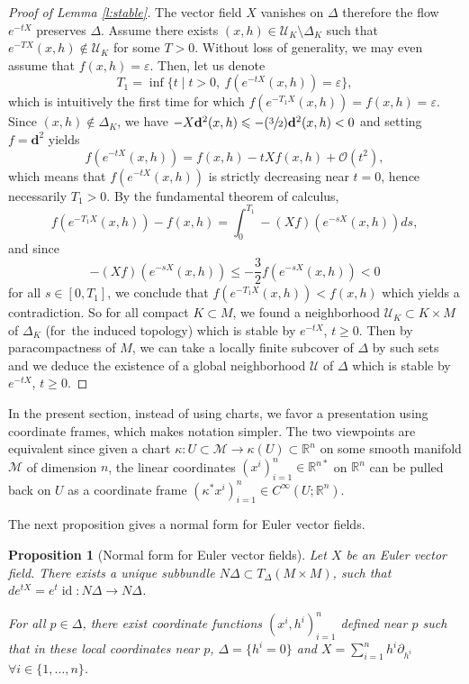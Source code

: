 \documentclass[10pt]{amsart}
\let\pazocal\mathscr
\newcommand{\Psfrac}[2]{(\sfrac{#1}{#2})}
\newtheorem{proposition}[theorem]{Proposition}
\theoremstyle{definition}
\newenvironment{refproof}[1]{\begin{proof}[Proof of {#1}]}{\end{proof}}
\let\st\mid
\let\euler X
\DeclareMathOperator\id{id}
\begin{document}
\begin{refproof}{Lemma \ref{l:stable}}
The vector field $\euler$ vanishes on $\Delta$ therefore the flow $e^{-t\euler}$
preserves $\Delta$.
Assume there exists $(x,h)\in \pazocal{U}_K\setminus \Delta_K$ such that $e^{-T\euler}(x,h)\notin \pazocal{U}_K$ for some $T> 0$.
Without loss of generality, we may even assume that $f(x,h)=\varepsilon$.
Then,
let us denote
\[
T_1=\inf\{t \st t>0,\ f(e^{-t\euler}(x,h))=\varepsilon \},
\]
which is intuitively
the first time for which $f(e^{-T_1\euler}(x,h))=f(x,h)=\varepsilon$.
Since $(x,h)\notin \Delta_K$, we have $-\euler \mathbf{d}^2(x,h)\leqslant -\Psfrac{3}{2} \mathbf{d}^2(x,h)<0$ and setting $f=\mathbf{d}^2$
yields
\[
f(e^{-t\euler}(x,h))=f(x,h)-t\euler f(x,h)+\pazocal{O} (t^2),
\]
which means that $f(e^{-t\euler}(x,h))$ is strictly decreasing near $t=0$, hence necessarily $T_1>0$. By the fundamental theorem of calculus,
\[
f(e^{-T_1\euler}(x,h))-f(x,h)=\int_0^{T_1} -{\left(\euler f\right)}(e^{-s\euler}(x,h))ds,
\]
and since
\[
-{\left(\euler f\right)}(e^{-s\euler}(x,h))\leqslant -\frac{3}{2}f(e^{-s\euler}(x,h)) <0
\]
for all $s\in [0,T_1]$, we conclude that
$f(e^{-T_1\euler}(x,h))<f(x,h)$ which yields a contradiction. So
for all compact $K\subset M$, we found a neighborhood $\pazocal{U}_K\subset K\times M$ of $\Delta_K$ (for~the induced topology) which is stable by $e^{-t\euler}$, $t\geqslant 0$. Then by paracompactness of $M$, we can take a locally finite subcover of $\Delta$ by such sets and we deduce the existence of a global neighborhood $\pazocal{U}$ of $\Delta$ which is stable by
$e^{-t\euler}$, $t\geqslant 0$.
\end{refproof}

In the present section, instead of using charts, we
favor a presentation using coordinate frames,
which makes notation
simpler. The two viewpoints are equivalent
since given a chart $\kappa:U\subset \pazocal{M}\to \kappa(U)\subset \mathbb{R}^n$ on some smooth manifold $\pazocal{M}$ of dimension $n$, the linear
coordinates $(x^i)_{i=1}^n \in \mathbb{R}^{n*}$ on $\mathbb{R}^n$ can be pulled back on
$U$ as a coordinate frame $(\kappa^*x^i)_{i=1}^n\in C^\infty(U;\mathbb{R}^n)$.

The next proposition gives a normal form for Euler vector fields.

\begin{proposition}[Normal form for Euler vector fields]\label{p:normalform}
Let $\euler$ be an Euler vector field. There exists a unique subbundle
$N\Delta\subset T_\Delta \left(M\times M\right)$, such that
$ de^{t\euler}=e^{t}\id: N\Delta\to N\Delta$.

For all $p\in \Delta$, there exist coordinate functions $(x^i,h^i)_{i=1}^n$ defined near $p$ such that in these local coordinates near $p$, $\Delta=\{h^i=0 \}$ and
$
\euler=\sum_{i=1}^n h^i\partial_{h^i}$ $\forall i\in \{1,\dots,n\}$.
\end{proposition}
\end{document}

